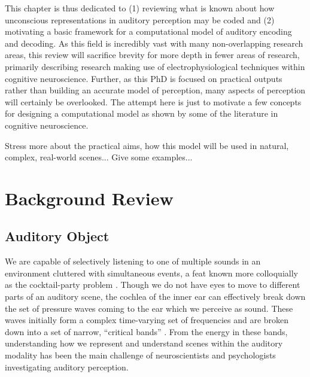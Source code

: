 \documentclass[a4paper,10pt,final]{ThesisStyle}
\begin{document}
This chapter is thus dedicated to (1) reviewing what is known about how unconscious representations in auditory perception may be coded and (2) motivating a basic framework for a computational model of auditory encoding and decoding.  As this field is incredibly vast with many non-overlapping research areas, this review will sacrifice brevity for more depth in fewer areas of research, primarily describing research making use of electrophysiological techniques within cognitive neuroscience.  Further, as this PhD is focused on practical outputs rather than building an accurate model of perception, many aspects of perception will certainly be overlooked.  The attempt here is just to motivate a few concepts for designing a computational model as shown by some of the literature in cognitive neuroscience.   

Stress more about the practical aims, how this model will be used in natural, complex, real-world scenes... Give some examples... 

\section{Background Review}

\subsection{Auditory Object}


We are capable of selectively listening to one of multiple sounds in an environment cluttered with simultaneous events, a feat known more colloquially as the cocktail-party problem \cite{McDermott2009}.  Though we do not have eyes to move to different parts of an auditory scene, the cochlea of the inner ear can effectively break down the set of pressure waves coming to the ear which we perceive as sound.  These waves initially form a complex time-varying set of frequencies and are broken down into a set of narrow, ``critical bands'' \cite{Fletcher1940}.  From the energy in these bands, understanding how we represent and understand scenes within the auditory modality has been the main challenge of neuroscientists and psychologists investigating auditory perception.  
\end{document}

